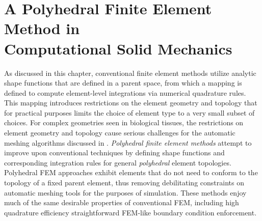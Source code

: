 \section[A Polyhedral Finite Element Method in Computational Solid \\ Mechanics]{\texorpdfstring{A Polyhedral Finite Element Method in \\ Computational Solid Mechanics}{A Polyhedral Finite Element Method in Computational Solid \\ Mechanics}}
\label{A Polyhedral Finite Element Method in Computational Solid Mechanics}

As discussed in this chapter, conventional finite element methods utilize analytic shape functions that are defined in a parent space, from which a mapping is defined to compute element-level integrations via numerical quadrature rules. This mapping introduces restrictions on the element geometry and topology that for practical purposes limits the choice of element type to a very small subset of choices. For complex geometries seen in biological tissues, the restrictions on element geometry and topology cause serious challenges for the automatic meshing algorithms discussed in . \textit{Polyhedral finite element methods} attempt to improve upon conventional techniques by defining shape functions and corresponding integration rules for general  \textit{polyhedral} element topologies. Polyhedral FEM approaches exhibit elements that do not need to conform to the topology of a fixed parent element, thus removing debilitating constraints on automatic meshing tools for the purposes of simulation. These methods enjoy much of the same desirable properties of conventional FEM, including high quadrature efficiency straightforward FEM-like boundary condition enforcement.

